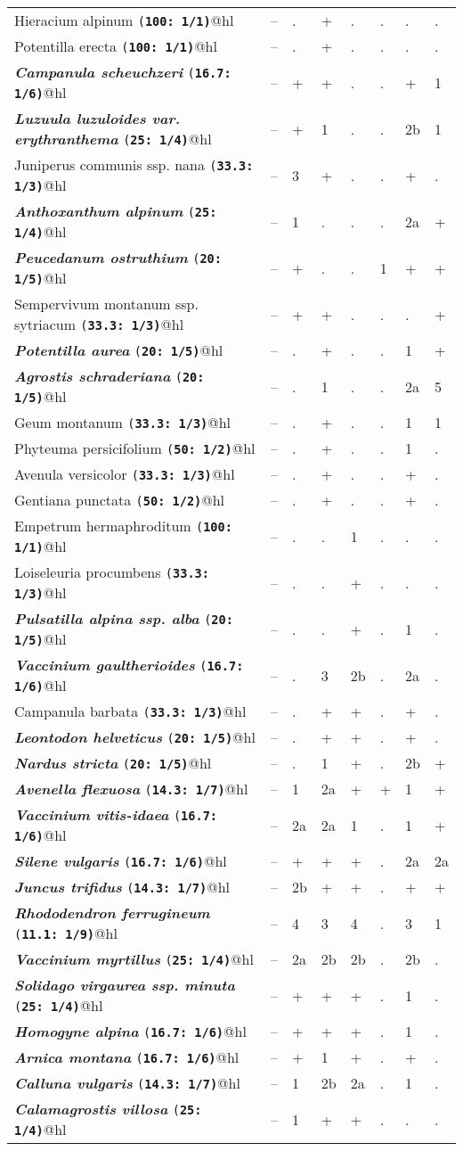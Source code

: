 {\begin{longtable}{llllllll}
Hieracium alpinum \texttt{(\bfseries{100}: 1/1)}@hl&--&.&+&.&.&.&.\tabularnewline
Potentilla erecta \texttt{(\bfseries{100}: 1/1)}@hl&--&.&+&.&.&.&.\tabularnewline
\textit{\textbf{Campanula scheuchzeri}} \texttt{(\bfseries{16.7}: 1/6)}@hl&--&+&+&.&.&+&1\tabularnewline
\textit{\textbf{Luzuula luzuloides var. erythranthema}} \texttt{(\bfseries{25}: 1/4)}@hl&--&+&1&.&.&2b&1\tabularnewline
Juniperus communis ssp. nana \texttt{(\bfseries{33.3}: 1/3)}@hl&--&3&+&.&.&+&.\tabularnewline
\textit{\textbf{Anthoxanthum alpinum}} \texttt{(\bfseries{25}: 1/4)}@hl&--&1&.&.&.&2a&+\tabularnewline
\textit{\textbf{Peucedanum ostruthium}} \texttt{(\bfseries{20}: 1/5)}@hl&--&+&.&.&1&+&+\tabularnewline
Sempervivum montanum ssp. sytriacum \texttt{(\bfseries{33.3}: 1/3)}@hl&--&+&+&.&.&.&+\tabularnewline
\textit{\textbf{Potentilla aurea}} \texttt{(\bfseries{20}: 1/5)}@hl&--&.&+&.&.&1&+\tabularnewline
\textit{\textbf{Agrostis schraderiana}} \texttt{(\bfseries{20}: 1/5)}@hl&--&.&1&.&.&2a&5\tabularnewline
Geum montanum \texttt{(\bfseries{33.3}: 1/3)}@hl&--&.&+&.&.&1&1\tabularnewline
Phyteuma persicifolium \texttt{(\bfseries{50}: 1/2)}@hl&--&.&+&.&.&1&.\tabularnewline
Avenula versicolor \texttt{(\bfseries{33.3}: 1/3)}@hl&--&.&+&.&.&+&.\tabularnewline
Gentiana punctata \texttt{(\bfseries{50}: 1/2)}@hl&--&.&+&.&.&+&.\tabularnewline
Empetrum hermaphroditum \texttt{(\bfseries{100}: 1/1)}@hl&--&.&.&1&.&.&.\tabularnewline
Loiseleuria procumbens \texttt{(\bfseries{33.3}: 1/3)}@hl&--&.&.&+&.&.&.\tabularnewline
\textit{\textbf{Pulsatilla alpina ssp. alba}} \texttt{(\bfseries{20}: 1/5)}@hl&--&.&.&+&.&1&.\tabularnewline
\textit{\textbf{Vaccinium gaultherioides}} \texttt{(\bfseries{16.7}: 1/6)}@hl&--&.&3&2b&.&2a&.\tabularnewline
Campanula barbata \texttt{(\bfseries{33.3}: 1/3)}@hl&--&.&+&+&.&+&.\tabularnewline
\textit{\textbf{Leontodon helveticus}} \texttt{(\bfseries{20}: 1/5)}@hl&--&.&+&+&.&+&.\tabularnewline
\textit{\textbf{Nardus stricta}} \texttt{(\bfseries{20}: 1/5)}@hl&--&.&1&+&.&2b&+\tabularnewline
\textit{\textbf{Avenella flexuosa}} \texttt{(\bfseries{14.3}: 1/7)}@hl&--&1&2a&+&+&1&+\tabularnewline
\textit{\textbf{Vaccinium vitis-idaea}} \texttt{(\bfseries{16.7}: 1/6)}@hl&--&2a&2a&1&.&1&+\tabularnewline
\textit{\textbf{Silene vulgaris}} \texttt{(\bfseries{16.7}: 1/6)}@hl&--&+&+&+&.&2a&2a\tabularnewline
\textit{\textbf{Juncus trifidus}} \texttt{(\bfseries{14.3}: 1/7)}@hl&--&2b&+&+&.&+&+\tabularnewline
\textit{\textbf{Rhododendron ferrugineum}} \texttt{(\bfseries{11.1}: 1/9)}@hl&--&4&3&4&.&3&1\tabularnewline
\textit{\textbf{Vaccinium myrtillus}} \texttt{(\bfseries{25}: 1/4)}@hl&--&2a&2b&2b&.&2b&.\tabularnewline
\textit{\textbf{Solidago virgaurea ssp. minuta}} \texttt{(\bfseries{25}: 1/4)}@hl&--&+&+&+&.&1&.\tabularnewline
\textit{\textbf{Homogyne alpina}} \texttt{(\bfseries{16.7}: 1/6)}@hl&--&+&+&+&.&1&.\tabularnewline
\textit{\textbf{Arnica montana}} \texttt{(\bfseries{16.7}: 1/6)}@hl&--&+&1&+&.&+&.\tabularnewline
\textit{\textbf{Calluna vulgaris}} \texttt{(\bfseries{14.3}: 1/7)}@hl&--&1&2b&2a&.&1&.\tabularnewline
\textit{\textbf{Calamagrostis villosa}} \texttt{(\bfseries{25}: 1/4)}@hl&--&1&+&+&.&.&.\tabularnewline
\bottomrule
 \end{longtable}
 } 
